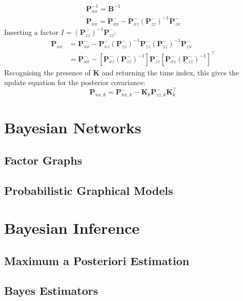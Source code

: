 \documentclass[11pt]{report} %
\begin{document}
\begin{gather}
\mathbf{P}_{xx}^{-1} = \mathbf{B}^{-1} \\
\mathbf{P}_{xx} = \mathbf{P}_{xx}^{-}-\mathbf{P}_{xz}^{-}\left(\mathbf{P}_{zz}^{-}\right)^{-1}\mathbf{P}_{zx}^{-}
\end{gather}
Inserting a factor $I = \left(\mathbf{P}_{zz}^{-}\right)^{-1}\mathbf{P}_{zz}^{-}$:
\begin{align}
\mathbf{P}_{xx} &= \mathbf{P}_{xx}^{-} - \mathbf{P}_{xz}^{-}\left(\mathbf{P}_{zz}^{-}\right)^{-1}\mathbf{P}_{zz}^{-}\left(\mathbf{P}_{zz}^{-}\right)^{-1}\mathbf{P}_{zx}^{-} \\
&= \mathbf{P}_{xx}^{-} - \left[\mathbf{P}_{xz}^{-}\left(\mathbf{P}_{zz}^{-}\right)^{-1}\right]\mathbf{P}_{zz}^{-}\left[\mathbf{P}_{xz}^{-}\left(\mathbf{P}_{zz}^{-}\right)^{-1}\right]^{\top}
\end{align}
Recognising the presence of $\mathbf{K}$ and returning the time index, this gives the update equation for the posterior covariance:
\begin{equation}
\mathbf{P}_{xx, k} = \mathbf{P}_{xx, k}^{-} - \mathbf{K}_{k}\mathbf{P}_{zz, k}^{-}\mathbf{K}_{k}^{\top}
\end{equation}

\section{Bayesian Networks}

\subsection{Factor Graphs}

\subsection{Probabilistic Graphical Models}

\section{Bayesian Inference}

\subsection{Maximum a Posteriori Estimation}

\subsection{Bayes Estimators}
\end{document}
